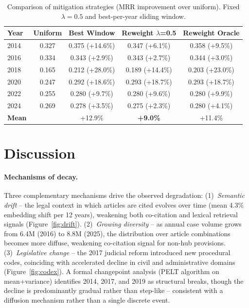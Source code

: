 \documentclass[11pt]{article}
\begin{document}
\begin{table}[t]
\centering
\small
\caption{Comparison of mitigation strategies (MRR improvement over uniform). Fixed $\lambda = 0.5$ and best-per-year sliding window.}
\label{tab:comparison}
\begin{tabular}{@{}l cc cc@{}}
\toprule
\textbf{Year} & \textbf{Uniform} & \textbf{Best Window} & \textbf{Reweight $\lambda$=0.5} & \textbf{Reweight Oracle} \\
\midrule
2014 & 0.327 & 0.375 (+14.6\%) & 0.347 (+6.1\%) & 0.358 (+9.5\%) \\
2016 & 0.334 & 0.343 (+2.9\%) & 0.343 (+2.7\%) & 0.344 (+3.0\%) \\
2018 & 0.165 & 0.212 (+28.0\%) & 0.189 (+14.4\%) & 0.203 (+23.0\%) \\
2020 & 0.247 & 0.292 (+18.6\%) & 0.293 (+18.7\%) & 0.293 (+18.7\%) \\
2022 & 0.255 & 0.280 (+9.7\%) & 0.280 (+9.6\%) & 0.280 (+9.9\%) \\
2024 & 0.269 & 0.278 (+3.5\%) & 0.275 (+2.3\%) & 0.280 (+4.1\%) \\
\midrule
\textbf{Mean} & & +12.9\% & \textbf{+9.0\%} & +11.4\% \\
\bottomrule
\end{tabular}
\end{table}

\section{Discussion}
\label{sec:discussion}

\paragraph{Mechanisms of decay.}
Three complementary mechanisms drive the observed degradation:
(1)~\emph{Semantic drift} -- the legal context in which articles are cited evolves over time (mean 4.3\% embedding shift per 12 years), weakening both co-citation and lexical retrieval signals (Figure~\ref{fig:drift}).
(2)~\emph{Growing diversity} -- as annual case volume grows from 6.4M (2016) to 8.8M (2025), the distribution over article combinations becomes more diffuse, weakening co-citation signal for non-hub provisions.
(3)~\emph{Legislative change} -- the 2017 judicial reform introduced new procedural codes, coinciding with accelerated decline in civil and administrative domains (Figure~\ref{fig:codex}).
A formal changepoint analysis (PELT algorithm on mean+variance) identifies 2014, 2017, and 2019 as structural breaks, though the decline is predominantly gradual rather than step-like -- consistent with a diffusion mechanism rather than a single discrete event.
\end{document}
